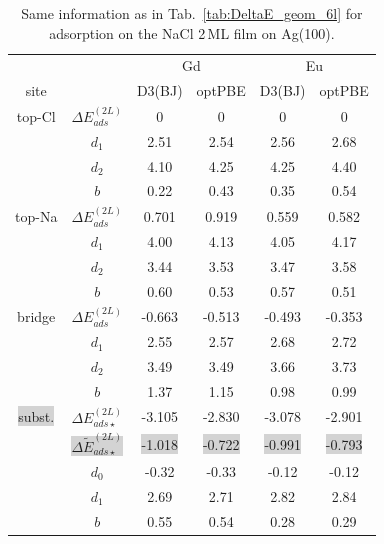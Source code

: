 {\begin{table}[h]
\caption{Same information as in Tab.~\ref{tab:DeltaE_geom_6l} for adsorption on the NaCl 2\,ML
film on Ag(100). }
\renewcommand{\arraystretch}{1.7}
\begin{ruledtabular}
 \begin{tabular}{c c     c  c | c c}
         &          & \multicolumn{2}{c|}{Gd}      & \multicolumn{2}{c}{Eu} \\
 site    &          &  D3(BJ)  &   optPBE          & D3(BJ)  &   optPBE     \\
\hline
top-Cl   &  $\Delta E^{(2L)}_{ads}$   &   0      &  0     &  0      &  0       \\
         &  $d_1$   &  2.51    &  2.54    &   2.56   &  2.68         \\
         &  $d_2$   &  4.10    &  4.25    &   4.25   &  4.40         \\
         &  $b$     &  0.22    &  0.43    &   0.35   &  0.54         \\
\hline
top-Na   &  $\Delta E^{(2L)}_{ads}$   &   0.701  &  0.919 &  0.559  &  0.582   \\
         &  $d_1$   &  4.00    &  4.13    &   4.05   &  4.17         \\
         &  $d_2$   &  3.44    &  3.53    &   3.47   &  3.58         \\
         &  $b$     &  0.60    &  0.53    &   0.57   &  0.51         \\
\hline
bridge   &  $\Delta E^{(2L)}_{ads}$  &  -0.663  & -0.513 & -0.493  & -0.353   \\
         &  $d_1$   &  2.55    &  2.57    &   2.68   &  2.72         \\
         &  $d_2$   &  3.49    &  3.49    &   3.66   &  3.73         \\
         &  $b$     &  1.37    &  1.15    &   0.98   &  0.99         \\
\hline
\colorbox{lightgray}{{ subst.}}   &  $\Delta E_{ads\star}^{(2L)}$  &  -3.105  & -2.830 & -3.078  & -2.901   \\
         &  \colorbox{lightgray}{${ \Delta \tilde E_{ads\star}^{(2L)} }$}           &  \colorbox{lightgray}{{ -1.018}}  & \colorbox{lightgray}{{ -0.722}} &  \colorbox{lightgray}{{-0.991}}  & \colorbox{lightgray}{{ -0.793}}   \\

         &  $d_0$   & -0.32    & -0.33    &  -0.12   & -0.12         \\
         &  $d_1$   &  2.69    &  2.71    &   2.82   &  2.84         \\
         &  $b$     &  0.55    &  0.54    &   0.28   &  0.29         \\
\end{tabular}
\end{ruledtabular}
\label{tab:DeltaE_geom_ag2l}
\end{table}



}
